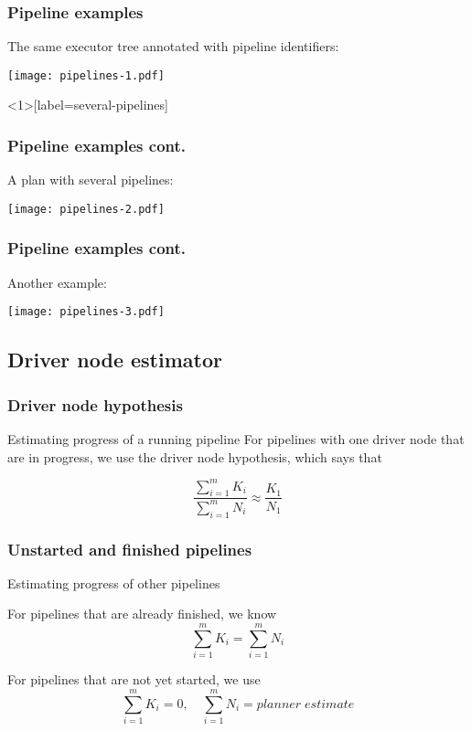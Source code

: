 \documentclass{beamer}
\begin{document}
\begin{frame}
  \frametitle{Pipeline examples}

  The same executor tree annotated with pipeline identifiers:
  \begin{center}
    \texttt{[image: pipelines-1.pdf]}
  \end{center}
\end{frame}

\begin{frame}<1>[label=several-pipelines]
  \frametitle{Pipeline examples cont.}

  A plan with several pipelines:
  \begin{center}
    \texttt{[image: pipelines-2.pdf]}
  \end{center}
\end{frame}

\begin{frame}
  \frametitle{Pipeline examples cont.}

  Another example:
  \begin{center}
    \texttt{[image: pipelines-3.pdf]}
  \end{center}
\end{frame}

\subsection{Driver node estimator}

\begin{frame}
  \frametitle{Driver node hypothesis}

  \begin{block}{Estimating progress of a running pipeline}
    For pipelines with one driver node that are in progress, we use the
    \alert{driver node hypothesis}, which says that

    \bigskip

    \begin{equation*}
      \frac{\sum\limits_{i=1}^{m} K_{i}}{\sum\limits_{i=1}^{m} N_{i}} \approx \frac{K_{1}}{N_{1}}
    \end{equation*}
  \end{block}
\end{frame}

\begin{frame}
  \frametitle{Unstarted and finished pipelines}

  \begin{block}{Estimating progress of other pipelines}

    For pipelines that are already \alert{finished}, we know
    \begin{equation*}
      \sum\limits_{i=1}^{m} K_{i} = \sum\limits_{i=1}^{m} N_{i}
    \end{equation*}

    For pipelines that are \alert{not yet started}, we use
    \begin{equation*}
      \sum\limits_{i=1}^{m} K_{i} = 0 , \quad \sum\limits_{i=1}^{m} N_{i} = planner\;estimate
    \end{equation*}
  \end{block}
\end{frame}
\end{document}
